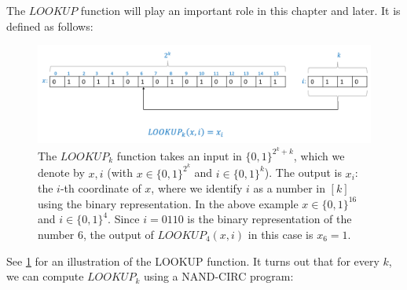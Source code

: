 The \(\ensuremath{\mathit{LOOKUP}}\) function will play an important
role in this chapter and later. It is defined as follows:

\hypertarget{lookup-def}{}


\begin{figure}
\centering
\includegraphics[width=\textwidth, height=0.25\paperheight, keepaspectratio]{../figure/lookupfunc.png}
\caption{The \(\ensuremath{\mathit{LOOKUP}}_k\) function takes an input
in \(\{0,1\}^{2^k+k}\), which we denote by \(x,i\) (with
\(x\in \{0,1\}^{2^k}\) and \(i \in \{0,1\}^k\)). The output is \(x_i\):
the \(i\)-th coordinate of \(x\), where we identify \(i\) as a number in
\([k]\) using the binary representation. In the above example
\(x\in \{0,1\}^{16}\) and \(i\in \{0,1\}^4\). Since \(i=0110\) is the
binary representation of the number \(6\), the output of
\(\ensuremath{\mathit{LOOKUP}}_4(x,i)\) in this case is \(x_6 = 1\).}
\label{lookupfig}
\end{figure}

See \cref{lookupfig} for an illustration of the LOOKUP function. It
turns out that for every \(k\), we can compute
\(\ensuremath{\mathit{LOOKUP}}_k\) using a NAND-CIRC program:

\hypertarget{lookup-thm}{}

